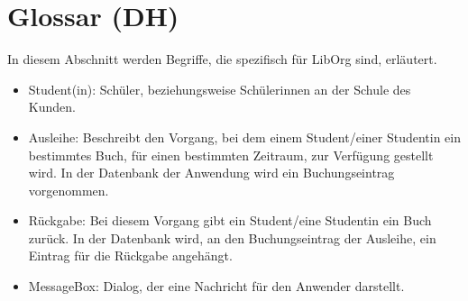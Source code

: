 \section{Glossar (DH)}
In diesem Abschnitt werden Begriffe, die spezifisch für LibOrg sind, erläutert.
\begin{itemize}
	\item Student(in): Schüler, beziehungsweise Schülerinnen an der Schule des Kunden.
	\item Ausleihe: Beschreibt den Vorgang, bei dem einem Student/einer Studentin ein bestimmtes Buch, für einen bestimmten Zeitraum, zur Verfügung gestellt wird. In der Datenbank der Anwendung wird ein Buchungseintrag vorgenommen.
	\item Rückgabe: Bei diesem Vorgang gibt ein Student/eine Studentin ein Buch zurück. In der Datenbank wird, an den Buchungseintrag der Ausleihe, ein Eintrag für die Rückgabe angehängt.
	\item MessageBox: Dialog, der eine Nachricht für den Anwender darstellt.
\end{itemize}